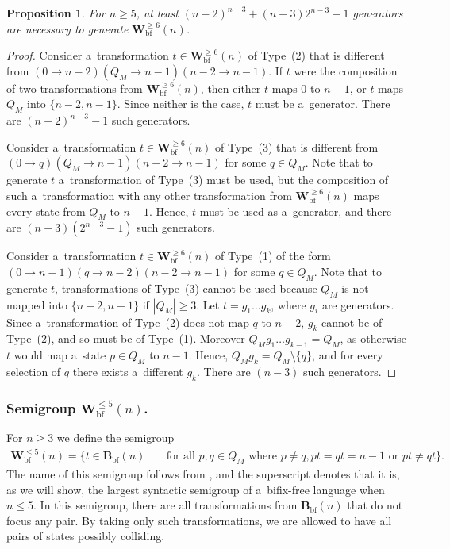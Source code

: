 \documentclass{amsart}
\newtheorem{proposition}[theorem]{Proposition}
\renewcommand{\le}{\leqslant}
\renewcommand{\ge}{\geqslant}
\newcommand{\Bbf}{\mathbf{B}_{\mathrm{bf}}}
\newcommand{\Vbf}{\mathbf{W}^{\le 5}_{\mathrm{bf}}}
\newcommand{\Wbf}{\mathbf{W}^{\ge 6}_{\mathrm{bf}}}
\begin{document}
\begin{proposition}\label{pro:Wbf_alphabet_lower_bound}
For $n \ge 5$, at least $(n-2)^{n-3} + (n-3)2^{n-3} - 1$ generators are necessary to generate $\Wbf(n)$.
\end{proposition}
\begin{proof}
Consider a~transformation $t \in \Wbf(n)$ of Type~(2) that is different from $(0 \to n-2)(Q_M \to n-1)(n-2 \to n-1)$.
If $t$ were the composition of two transformations from $\Wbf(n)$, then either $t$ maps $0$ to $n-1$, or $t$ maps $Q_M$ into $\{n-2,n-1\}$.
Since neither is the case, $t$ must be a~generator.
There are $(n-2)^{n-3} - 1$ such generators.

Consider a~transformation $t \in \Wbf(n)$ of Type~(3) that is different from $(0 \to q)(Q_M \to n-1)(n-2 \to n-1)$ for some $q \in Q_M$.
Note that to generate $t$ a~transformation of Type~(3) must be used, but the composition of such a~transformation with any other transformation from $\Wbf(n)$ maps every state from $Q_M$ to $n-1$.
Hence, $t$ must be used as a~generator, and there are $(n-3)(2^{n-3}-1)$ such generators.

Consider a~transformation $t \in \Wbf(n)$ of Type~(1) of the form $(0 \to n-1)(q \to n-2)(n-2 \to n-1)$ for some $q \in Q_M$.
Note that to generate $t$, transformations of Type~(3) cannot be used because $Q_M$ is not mapped into $\{n-2,n-1\}$ if $|Q_M| \ge 3$.
Let $t = g_1 \dots g_k$, where $g_i$ are generators.
Since a~transformation of Type~(2) does not map $q$ to $n-2$, $g_k$ cannot be of Type~(2), and so must be of Type~(1).
Moreover $Q_M g_1 \dots g_{k-1} = Q_M$, as otherwise $t$ would map a~state $p \in Q_M$ to $n-1$.
Hence, $Q_M g_k = Q_M \setminus \{q\}$, and for every selection of $q$ there exists a~different $g_k$.
There are $(n-3)$ such generators.
\end{proof}

\subsubsection{Semigroup $\Vbf(n)$.}

For $n \ge 3$ we define the semigroup
\begin{eqnarray*}
\Vbf(n) = \{t \in \Bbf(n) & \mid & \text{for all }p,q \in Q_M\text{ where }p \neq q, pt = qt = n-1\text{ or }pt \neq qt\}.
\end{eqnarray*}
The name of this semigroup follows from \cite{BLY12}, and the superscript denotes that it is, as we will show, the largest syntactic semigroup of a~bifix-free language when $n \le 5$.
In this semigroup, there are all transformations from $\Bbf(n)$ that do not focus any pair.
By taking only such transformations, we are allowed to have all pairs of states possibly colliding.
\end{document}
